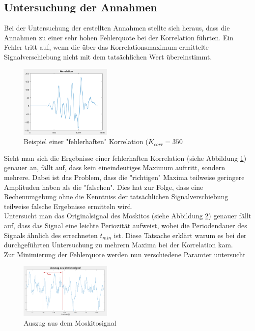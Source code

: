\subsection{Untersuchung der Annahmen} \label{sec:Untersuchung}
Bei der Untersuchung der erstellten Annahmen stellte sich heraus, dass die Annahmen zu einer sehr hohen Fehlerquote bei der Korrelation führten. Ein Fehler tritt auf, wenn die über das Korrelationsmaximum ermittelte Signalverschiebung nicht mit dem tatsächlichen Wert übereinstimmt. \\

\begin{figure}
\centering 
\includegraphics[width=0.4\textwidth]{KorrelationA}
\caption{Beispiel einer "fehlerhaften" Korrelation ($K_{corr}=350$}\label{fig:KorrelationA}
\end{figure}



Sieht man sich die Ergebnisse einer fehlerhaften Korrelation (siehe Abbildung \ref{fig:KorrelationA}) genauer an, fällt auf, dass kein eineindeutiges Maximum auftritt, sondern mehrere. Dabei ist das Problem, dass die "richtigen" Maxima teilweise geringere Amplituden haben als die "falschen". Dies hat zur Folge, dass eine Rechenumgebung ohne die Kenntniss der tatsächlichen Signalverschiebung teilweise falsche Ergebnisse ermitteln wird.\\
Untersucht man das Originalsignal des Moskitos (siehe Abbildung \ref{fig:KorrelationAnalyse2}) genauer fällt auf, dass das Signal eine leichte Periozität aufweist, wobei die Periodendauer des Signals ähnlich des errechneten $t_{min}$ ist. Diese Tatsache erklärt warum es bei der durchgeführten Untersuchung zu mehrern Maxima bei der Korrelation kam. \\
Zur Minimierung der Fehlerquote werden nun verschiedene Paramter untersucht

\begin{figure}
\centering 
\includegraphics[width=0.4\textwidth]{KorrelationsAnalyse2}
\caption{Auszug aus dem Moskitosignal} \label{fig:KorrelationAnalyse2}
\end{figure}

